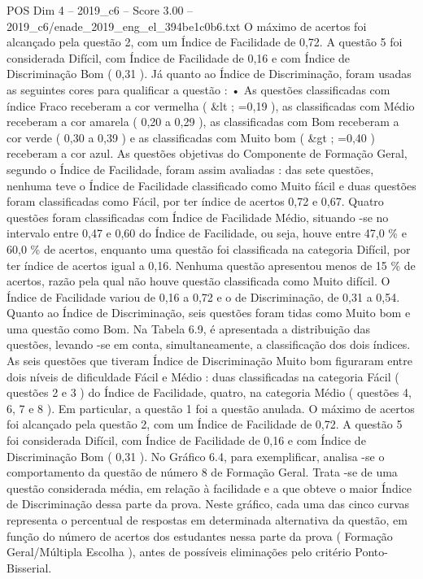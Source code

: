 \begin{textsample}{POS Dim 4 – 2019\_c6 – Score 3.00 – 2019\_c6/enade\_2019\_eng\_el\_394be1c0b6.txt}
O máximo de acertos foi alcançado pela questão 2, com um Índice de Facilidade de 0,72.
A questão 5 foi considerada Difícil, com Índice de Facilidade de 0,16 e com Índice de Discriminação Bom ( 0,31 ).
Já quanto ao Índice de Discriminação, foram usadas as seguintes cores para qualificar a questão : • As questões classificadas com índice Fraco receberam a cor vermelha ( \&lt ; =0,19 ), as classificadas com Médio receberam a cor amarela ( 0,20 a 0,29 ), as classificadas com Bom receberam a cor verde ( 0,30 a 0,39 ) e as classificadas com Muito bom ( \&gt ; =0,40 ) receberam a cor azul.
As questões objetivas do Componente de Formação Geral, segundo o Índice de Facilidade, foram assim avaliadas : das sete questões, nenhuma teve o Índice de Facilidade classificado como Muito fácil e duas questões foram classificadas como Fácil, por ter índice de acertos 0,72 e 0,67.
Quatro questões foram classificadas com Índice de Facilidade Médio, situando -se no intervalo entre 0,47 e 0,60 do Índice de Facilidade, ou seja, houve entre 47,0 \% e 60,0 \% de acertos, enquanto uma questão foi classificada na categoria Difícil, por ter índice de acertos igual a 0,16.
Nenhuma questão apresentou menos de 15 \% de acertos, razão pela qual não houve questão classificada como Muito difícil.
O Índice de Facilidade variou de 0,16 a 0,72 e o de Discriminação, de 0,31 a 0,54.
Quanto ao Índice de Discriminação, seis questões foram tidas como Muito bom e uma questão como Bom.
Na Tabela 6.9, é apresentada a distribuição das questões, levando -se em conta, simultaneamente, a classificação dos dois índices.
As seis questões que tiveram Índice de Discriminação Muito bom figuraram entre dois níveis de dificuldade Fácil e Médio : duas classificadas na categoria Fácil ( questões 2 e 3 ) do Índice de Facilidade, quatro, na categoria Médio ( questões 4, 6, 7 e 8 ).
Em particular, a questão 1 foi a questão anulada.
O máximo de acertos foi alcançado pela questão 2, com um Índice de Facilidade de 0,72.
A questão 5 foi considerada Difícil, com Índice de Facilidade de 0,16 e com Índice de Discriminação Bom ( 0,31 ).
No Gráfico 6.4, para exemplificar, analisa -se o comportamento da questão de número 8 de Formação Geral.
Trata -se de uma questão considerada média, em relação à facilidade e a que obteve o maior Índice de Discriminação dessa parte da prova.
Neste gráfico, cada uma das cinco curvas representa o percentual de respostas em determinada alternativa da questão, em função do número de acertos dos estudantes nessa parte da prova ( Formação Geral/Múltipla Escolha ), antes de possíveis eliminações pelo critério Ponto-Bisserial.

\end{textsample}

